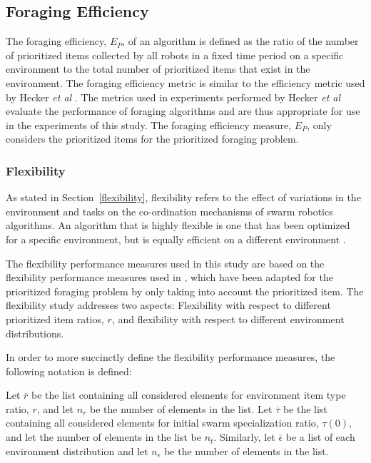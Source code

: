 \documentclass[preprint,12pt]{elsarticle}
\begin{document}
\subsection{Foraging Efficiency}
\label{setup:foragingefficiency}
The foraging efficiency, $E_P$, of an algorithm is defined as the ratio of the number of prioritized items collected by all robots in a fixed time period on a specific environment to the total number of prioritized items that exist in the environment. The foraging efficiency metric is similar to the efficiency metric used by Hecker \textit{et al} \cite{hecker2015beyond}. The metrics used in experiments performed by Hecker \textit{et al} evaluate the performance of foraging algorithms and are thus appropriate for use in the experiments of this study. The foraging efficiency measure, $E_P$, only considers the prioritized items for the prioritized foraging problem.


\subsubsection{Flexibility}
\label{setup:flexibility}

As stated in Section~\ref{flexibility}, flexibility refers to the effect of variations in the environment and tasks on the co-ordination mechanisms of swarm robotics algorithms. An algorithm that is highly flexible is one that has been optimized for a specific environment, but is equally efficient on a different environment \cite{hecker2015beyond}.

The flexibility performance measures used in this study are based on the flexibility performance measures used in \cite{hecker2015beyond}, which have been adapted for the prioritized foraging problem by only taking into account the prioritized item. The flexibility study addresses two aspects: Flexibility with respect to different prioritized item ratios, $r$, and flexibility with respect to different environment distributions.

In order to more succinctly define the flexibility performance measures, the following notation is defined:

Let $\overline{r}$ be the list containing all considered elements for environment item type ratio, $r$, and let $n_r$ be the number of elements in the list. Let $\overline{\tau}$ be the list containing all considered elements for initial swarm specialization ratio, $\tau(0)$, and let the number of elements in the list be $n_t$. Similarly, let $\overline{\epsilon}$ be a list of each environment distribution and let $n_\epsilon$ be the number of elements in the list.
\end{document}
